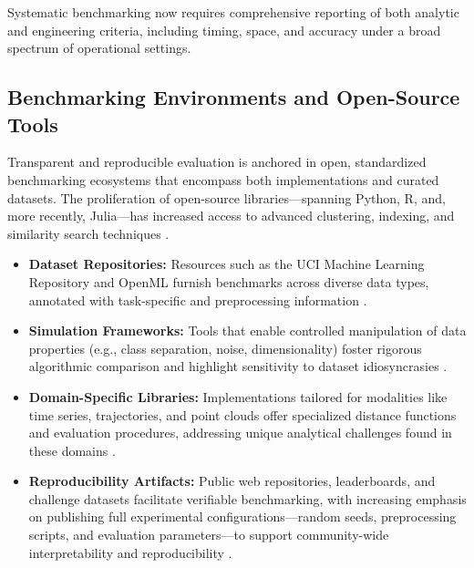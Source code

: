 Systematic benchmarking now requires comprehensive reporting of both analytic and engineering criteria, including timing, space, and accuracy under a broad spectrum of operational settings.

\subsection{Benchmarking Environments and Open-Source Tools}

Transparent and reproducible evaluation is anchored in open, standardized benchmarking ecosystems that encompass both implementations and curated datasets. The proliferation of open-source libraries—spanning Python, R, and, more recently, Julia—has increased access to advanced clustering, indexing, and similarity search techniques \cite{ref14, ref21, ref22, ref27, ref28, ref30, ref33, ref36, ref37, ref38, ref39, ref40, ref44, ref46, ref64, ref68, ref75, ref80, ref81, ref86, ref87, ref91, ref92, ref93, ref94, ref95, ref99, ref100, ref110}.

\begin{itemize}
    \item \textbf{Dataset Repositories:} Resources such as the UCI Machine Learning Repository and OpenML furnish benchmarks across diverse data types, annotated with task-specific and preprocessing information \cite{ref14, ref80, ref81, ref87, ref92, ref93}.
    \item \textbf{Simulation Frameworks:} Tools that enable controlled manipulation of data properties (e.g., class separation, noise, dimensionality) foster rigorous algorithmic comparison and highlight sensitivity to dataset idiosyncrasies \cite{ref33, ref99, ref100, ref110}.
    \item \textbf{Domain-Specific Libraries:} Implementations tailored for modalities like time series, trajectories, and point clouds offer specialized distance functions and evaluation procedures, addressing unique analytical challenges found in these domains \cite{ref75, ref92, ref93, ref94}.
    \item \textbf{Reproducibility Artifacts:} Public web repositories, leaderboards, and challenge datasets facilitate verifiable benchmarking, with increasing emphasis on publishing full experimental configurations—random seeds, preprocessing scripts, and evaluation parameters—to support community-wide interpretability and reproducibility \cite{ref14, ref44, ref64, ref80, ref81, ref91, ref95, ref99}.
\end{itemize}

